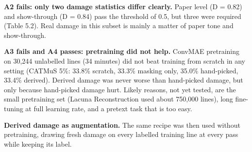 \documentclass[
  12pt,
  a4paper,
]{report}
\begin{document}
\textbf{A2 fails: only two damage statistics differ clearly.} Paper
level (D = 0.82) and show-through (D = 0.84) pass the threshold of 0.5,
but three were required (Table 5.2). Real damage in this subset is
mainly a matter of paper tone and show-through.

\textbf{A3 fails and A4 passes: pretraining did not help.} ConvMAE
pretraining on 30,244 unlabelled lines (34 minutes) did not beat
training from scratch in any setting (CATMuS 5\%: 33.8\% scratch, 33.3\%
masking only, 35.0\% hand-picked, 33.4\% derived). Derived damage was
never worse than hand-picked damage, but only because hand-picked damage
hurt. Likely reasons, not yet tested, are the small pretraining set
(Lacuna Reconstruction used about 750,000 lines), long fine-tuning at
full learning rate, and a pretext task that is too easy.

\textbf{Derived damage as augmentation.} The same recipe was then used
without pretraining, drawing fresh damage on every labelled training
line at every pass while keeping its label.
\end{document}
